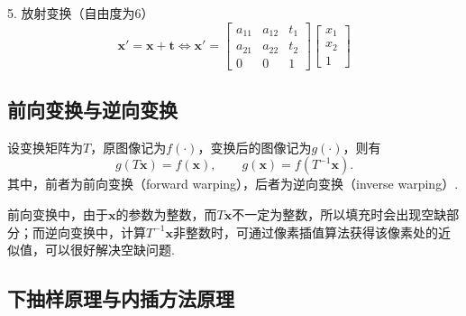 \documentclass[12pt, a4paper, oneside]{ctexart}
\numberwithin{equation}{section}  %
\def\bd{\boldsymbol}        %
\begin{document}
5. 放射变换（自由度为$6$）
\begin{equation*}
    \bd{x}' = \bd{x}+\bd{t}\iff \bd{x}' = \left[\begin{matrix}
        a_{11}&a_{12}&t_1\\
        a_{21}&a_{22}&t_2\\
        0&0&1
    \end{matrix}\right]\left[\begin{matrix}
        x_1\\x_2\\1
    \end{matrix}\right]
\end{equation*}
\subsection{前向变换与逆向变换}
设变换矩阵为$T$，原图像记为$f(\cdot)$，变换后的图像记为$g(\cdot)$，则有
\begin{equation*}
    g(T\bd{x}) = f(\bd{x}),\qquad g(\bd{x}) = f(T^{-1}\bd{x}).
\end{equation*}
其中，前者为前向变换（forward warping），后者为逆向变换（inverse warping）. 

前向变换中，由于$\bd{x}$的参数为整数，而$T\bd{x}$不一定为整数，所以填充时会出现空缺部分；而逆向变换中，计算$T^{-1}\bd{x}$非整数时，可通过像素插值算法获得该像素处的近似值，可以很好解决空缺问题.
\subsection{下抽样原理与内插方法原理}
\end{document}

